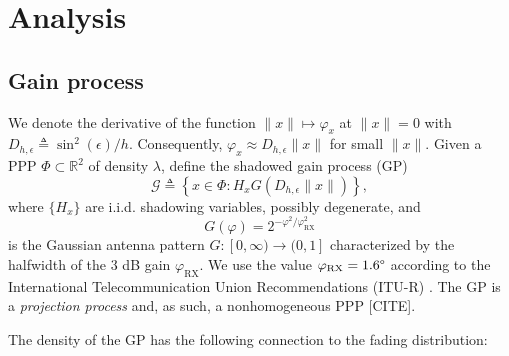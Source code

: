 \documentclass[conference]{IEEEtran}
\newcommand{\R}{\mathbb{R}}
\theoremstyle{definition}
\theoremstyle{plain}
\begin{document}
         
         \section{Analysis}
         
         \subsection{Gain process}
         We denote the derivative of the function $\|x\| \mapsto \varphi_x $ at $\|x\| =0$ with $D_{h,\epsilon} \triangleq \sin^2(\epsilon)/h$. Consequently, $\varphi_x \approx D_{h,\epsilon}\|x\|$ for small $\|x\|$.
         Given a PPP $\Phi \subset \R^2$ of density $\lambda$, define the shadowed gain process (GP)
         \begin{equation}
           \label{eq:gainprocess}
           \mathcal{G} \triangleq \left\{x \in \Phi : H_x G(D_{h,\epsilon}\|x\|) \right\},
          \end{equation}
          where $\{H_x\}$ are i.i.d. shadowing variables, possibly degenerate, and 
          \begin{equation}
            G(\varphi) = 2^{-\varphi^2/\varphi^2_{\text{RX}}}
          \end{equation}
          is the Gaussian antenna pattern $G:[0,\infty) \rightarrow (0,1]$ characterized by the halfwidth of the $3$ dB gain $\varphi_{\text{RX}}$. We use the value $\varphi_{\text{RX}} = 1.6 \degree$ according to the International Telecommunication Union Recommendations (ITU-R) \cite{ITURS1528}. The GP is a \textit{projection process} and, as such, a nonhomogeneous PPP [CITE].

            The density of the GP has the following connection to the fading distribution:
\end{document}
